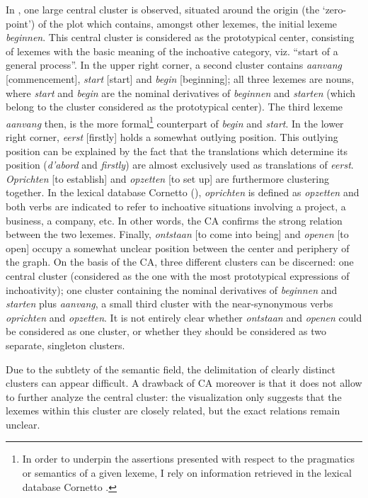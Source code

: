In , one large central cluster is observed, situated around the origin (the ‘zero-point’) of the plot which contains, amongst other lexemes, the initial lexeme \textit{beginnen}. This central cluster is considered as the prototypical center, consisting of lexemes with the basic meaning of the inchoative category, viz. “start of a general process”. In the upper right corner, a second cluster contains \textit{aanvang} [commencement], \textit{start} [start] and \textit{begin} [beginning]; all three lexemes are nouns, where \textit{start} and \textit{begin} are the nominal derivatives of \textit{beginnen} and \textit{starten} (which belong to the cluster considered as the prototypical center). The third lexeme \textit{aanvang} then, is the more formal\footnote{In order to underpin the assertions presented with respect to the pragmatics or semantics of a given lexeme, I rely on information retrieved in the lexical database Cornetto \citep{spyns_cornetto:_2013}.} counterpart of \textit{begin} and \textit{start}. In the lower right corner, \textit{eerst} [firstly] holds a somewhat outlying position. This outlying position can be explained by the fact that the translations which determine its position (\textit{d’abord} and \textit{firstly}) are almost exclusively used as translations of \textit{eerst}. \textit{Oprichten} [to establish] and \textit{opzetten} [to set up] are furthermore clustering together. In the lexical database Cornetto (\citealt{vossen_cornetto_2008, spyns_cornetto:_2013}), \textit{oprichten} is defined as \textit{opzetten} and both verbs are indicated to refer to inchoative situations involving a project, a business, a company, etc. In other words, the CA confirms the strong relation between the two lexemes. Finally, \textit{ontstaan} [to come into being] and \textit{openen} [to open] occupy a somewhat unclear position between the center and periphery of the graph. On the basis of the CA, three different clusters can be discerned: one central cluster (considered as the one with the most prototypical expressions of inchoativity); one cluster containing the nominal derivatives of \textit{beginnen} and \textit{starten} plus \textit{aanvang}, a small third cluster with the near-synonymous verbs \textit{oprichten} and \textit{opzetten}. It is not entirely clear whether \textit{ontstaan} and \textit{openen} could be considered as one cluster, or whether they should be considered as two separate, singleton clusters.



Due to the subtlety of the semantic field, the delimitation of clearly distinct clusters can appear difficult. A drawback of CA moreover is that it does not allow to further analyze the central cluster: the visualization only suggests that the lexemes within this cluster are closely related, but the exact relations remain unclear.




